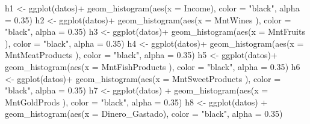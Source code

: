 \documentclass[
]{article}
\newenvironment{Shaded}{\begin{snugshade}}{\end{snugshade}}
\newcommand{\AttributeTok}[1]{\textcolor[rgb]{0.77,0.63,0.00}{#1}}
\newcommand{\FloatTok}[1]{\textcolor[rgb]{0.00,0.00,0.81}{#1}}
\newcommand{\FunctionTok}[1]{\textcolor[rgb]{0.00,0.00,0.00}{#1}}
\newcommand{\NormalTok}[1]{#1}
\newcommand{\OtherTok}[1]{\textcolor[rgb]{0.56,0.35,0.01}{#1}}
\newcommand{\SpecialCharTok}[1]{\textcolor[rgb]{0.00,0.00,0.00}{#1}}
\newcommand{\StringTok}[1]{\textcolor[rgb]{0.31,0.60,0.02}{#1}}
\begin{document}
\begin{Shaded}
\begin{Highlighting}[]
\NormalTok{h1 }\OtherTok{\textless{}{-}} \FunctionTok{ggplot}\NormalTok{(datos)}\SpecialCharTok{+}
  \FunctionTok{geom\_histogram}\NormalTok{(}\FunctionTok{aes}\NormalTok{(}\AttributeTok{x =}\NormalTok{ Income), }\AttributeTok{color =} \StringTok{"black"}\NormalTok{, }\AttributeTok{alpha =} \FloatTok{0.35}\NormalTok{)}
\NormalTok{h2 }\OtherTok{\textless{}{-}} \FunctionTok{ggplot}\NormalTok{(datos)}\SpecialCharTok{+}
  \FunctionTok{geom\_histogram}\NormalTok{(}\FunctionTok{aes}\NormalTok{(}\AttributeTok{x =}\NormalTok{ MntWines ), }\AttributeTok{color =} \StringTok{"black"}\NormalTok{, }\AttributeTok{alpha =} \FloatTok{0.35}\NormalTok{)}
\NormalTok{h3 }\OtherTok{\textless{}{-}} \FunctionTok{ggplot}\NormalTok{(datos)}\SpecialCharTok{+}
  \FunctionTok{geom\_histogram}\NormalTok{(}\FunctionTok{aes}\NormalTok{(}\AttributeTok{x =}\NormalTok{ MntFruits ), }\AttributeTok{color =} \StringTok{"black"}\NormalTok{, }\AttributeTok{alpha =} \FloatTok{0.35}\NormalTok{)}
\NormalTok{h4 }\OtherTok{\textless{}{-}} \FunctionTok{ggplot}\NormalTok{(datos)}\SpecialCharTok{+}
  \FunctionTok{geom\_histogram}\NormalTok{(}\FunctionTok{aes}\NormalTok{(}\AttributeTok{x =}\NormalTok{ MntMeatProducts ), }\AttributeTok{color =} \StringTok{"black"}\NormalTok{, }\AttributeTok{alpha =} \FloatTok{0.35}\NormalTok{)}
\NormalTok{h5 }\OtherTok{\textless{}{-}} \FunctionTok{ggplot}\NormalTok{(datos)}\SpecialCharTok{+}
  \FunctionTok{geom\_histogram}\NormalTok{(}\FunctionTok{aes}\NormalTok{(}\AttributeTok{x =}\NormalTok{ MntFishProducts ), }\AttributeTok{color =} \StringTok{"black"}\NormalTok{, }\AttributeTok{alpha =} \FloatTok{0.35}\NormalTok{)}
\NormalTok{h6 }\OtherTok{\textless{}{-}} \FunctionTok{ggplot}\NormalTok{(datos)}\SpecialCharTok{+}
  \FunctionTok{geom\_histogram}\NormalTok{(}\FunctionTok{aes}\NormalTok{(}\AttributeTok{x =}\NormalTok{ MntSweetProducts ), }\AttributeTok{color =} \StringTok{"black"}\NormalTok{, }\AttributeTok{alpha =} \FloatTok{0.35}\NormalTok{)}
\NormalTok{h7 }\OtherTok{\textless{}{-}} \FunctionTok{ggplot}\NormalTok{(datos) }\SpecialCharTok{+}
  \FunctionTok{geom\_histogram}\NormalTok{(}\FunctionTok{aes}\NormalTok{(}\AttributeTok{x =}\NormalTok{ MntGoldProds ), }\AttributeTok{color =} \StringTok{"black"}\NormalTok{, }\AttributeTok{alpha =} \FloatTok{0.35}\NormalTok{)}
\NormalTok{h8 }\OtherTok{\textless{}{-}} \FunctionTok{ggplot}\NormalTok{(datos) }\SpecialCharTok{+}
  \FunctionTok{geom\_histogram}\NormalTok{(}\FunctionTok{aes}\NormalTok{(}\AttributeTok{x =}\NormalTok{ Dinero\_Gastado), }\AttributeTok{color =} \StringTok{"black"}\NormalTok{, }\AttributeTok{alpha =} \FloatTok{0.35}\NormalTok{)}

\end{Highlighting}
\end{Shaded}
\end{document}
